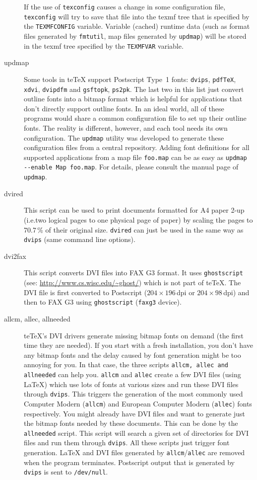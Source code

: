 \documentclass[11pt,a4paper]{article}
\newcommand{\teTeX}{\textrm{te}\TeX\xspace}
\begin{document}
\begin{description}
  If the use of \verb+texconfig+ causes a change in some configuration
  file, \verb+texconfig+ will try to save that file into the texmf
  tree that is specified by the \verb+TEXMFCONFIG+ variable. Variable
  (cached) runtime data (such as format files generated by
  \verb+fmtutil+, map files generated by \verb+updmap+) will be stored
  in the texmf tree specified by the \verb+TEXMFVAR+ variable.
\item[updmap] Some tools in \teTeX{} support Postscript Type~1
  fonts: \texttt{dvips}, \texttt{pdf\TeX}, \texttt{xdvi},
  \texttt{dvipdfm} and \texttt{gsftopk}, \texttt{ps2pk}. The last two
  in this list just convert outline fonts into a bitmap format which
  is helpful for applications that don't directly support outline
  fonts. In an ideal world, all of these programs would share a common
  configuration file to set up their outline fonts. The reality is
  different, however, and each tool needs its own configuration. The
  \texttt{updmap} utility was developed to generate these
  configuration files from a central repository. Adding font
  definitions for all supported applications from a map file
  \texttt{foo.map} can be as easy as %
  \verb+updmap --enable Map foo.map+. For details, please consult the
  manual page of \texttt{updmap}.
\item[dvired] This script can be used to print documents formatted for
  A4 paper 2-up (i.e.\@ two logical pages to one physical page of
  paper) by scaling the pages to 70.7\,\% of their original size.
  \texttt{dvired} can just be used in the same way as \texttt{dvips}
  (same command line options).
\item[dvi2fax] This script converts DVI files into FAX G3 format. It
  uses \texttt{ghostscript} (see:
  \url{http://www.cs.wisc.edu/~ghost/}) which is not part of \teTeX{}.
  The DVI file is first converted to Postscript ($204\times 196$\,dpi
  or $204\times 98$\,dpi) and then to FAX G3 using
  \texttt{ghostscript} (\texttt{faxg3} device).
\item[allcm, allec, allneeded] \teTeX's DVI drivers generate missing
  bitmap fonts on demand (the first time they are needed). If you
  start with a fresh installation, you don't have any bitmap fonts and
  the delay caused by font generation might be too annoying for you.
  In that case, the three scripts \texttt{allcm, allec and allneeded}
  can help you. \texttt{allcm} and \texttt{allec} create a few DVI
  files (using \LaTeX) which use lots of fonts at various sizes and run
  these DVI files through \texttt{dvips}. This triggers the generation
  of the most commonly used Computer Modern (\texttt{allcm}) and
  European Computer Modern (\texttt{allec}) fonts respectively. You
  might already have DVI files and want to generate just the bitmap
  fonts needed by these documents. This can be done by the
  \texttt{allneeded} script.  This script will search a given set of
  directories for DVI files and run them through \texttt{dvips}. All
  these scripts just trigger font generation. \LaTeX{} and DVI files
  generated by \texttt{allcm}/\texttt{allec} are removed when the
  program terminates. Postscript output that is generated by
  \texttt{dvips} is sent to \texttt{/dev/null}.
  

\end{description}
\end{document}
